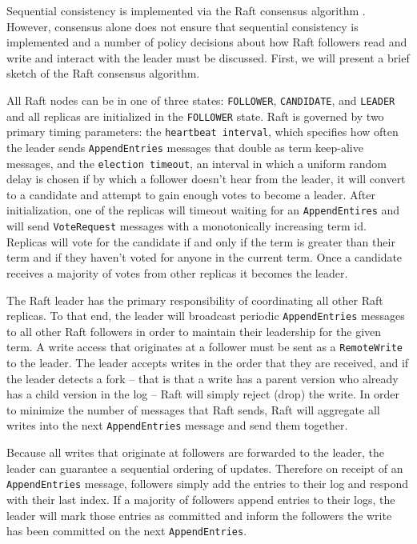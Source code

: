 \documentclass[10pt,conference,compsocconf,letterpaper]{IEEEtran}
\begin{document}
Sequential consistency is implemented via the Raft consensus algorithm \cite{ongaro_search_2014}. However, consensus alone does not ensure that sequential consistency is implemented and a number of policy decisions about how Raft followers read and write and interact with the leader must be discussed. First, we will present a brief sketch of the Raft consensus algorithm.

All Raft nodes can be in one of three states: \texttt{FOLLOWER}, \texttt{CANDIDATE}, and \texttt{LEADER} and all replicas are initialized in the \texttt{FOLLOWER} state. Raft is governed by two primary timing parameters: the \texttt{heartbeat interval}, which specifies how often the leader sends \texttt{AppendEntries} messages that double as term keep-alive messages, and the \texttt{election timeout}, an interval in which a uniform random delay is chosen if by which a follower doesn't hear from the leader, it will convert to a candidate and attempt to gain enough votes to become a leader. After initialization, one of the replicas will timeout waiting for an \texttt{AppendEntires} and will send \texttt{VoteRequest} messages with a monotonically increasing term id. Replicas will vote for the candidate if and only if the term is greater than their term and if they haven't voted for anyone in the current term. Once a candidate receives a majority of votes from other replicas it becomes the leader.

The Raft leader has the primary responsibility of coordinating all other Raft replicas. To that end, the leader will broadcast periodic \texttt{AppendEntries} messages to all other Raft followers in order to maintain their leadership for the given term. A write access that originates at a follower must be sent as a \texttt{RemoteWrite} to the leader. The leader accepts writes in the order that they are received, and if the leader detects a fork -- that is that a write has a parent version who already has a child version in the log -- Raft will simply reject (drop) the write. In order to minimize the number of messages that Raft sends, Raft will aggregate all writes into the next \texttt{AppendEntries} message and send them together.

Because all writes that originate at followers are forwarded to the leader, the leader can guarantee a sequential ordering of updates. Therefore on receipt of an \texttt{AppendEntries} message, followers simply add the entries to their log and respond with their last index. If a majority of followers append entries to their logs, the leader will mark those entries as committed and inform the followers the write has been committed on the next \texttt{AppendEntries}.
\end{document}
